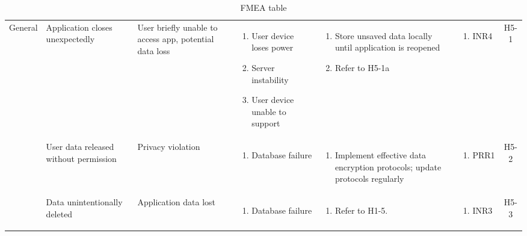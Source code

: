 \documentclass{article}
\begin{document}
\begin{longtable}{|p{1.7cm}|p{1.7cm} p{2.4cm} p{2.4cm} p{3.5cm} p{1.6cm} c|}
        General & Application closes unexpectedly & User briefly unable to access app, potential data loss & \vspace*{-\baselineskip}\begin{enumerate}[label=\alph*., left=0pt, nosep]\item User device loses power \item Server instability \item User device unable to support \end{enumerate} & \vspace*{-\baselineskip}\begin{enumerate}[label=\alph*., left=0pt, nosep] \item Store unsaved data locally until application is reopened \item Refer to H5-1a \end{enumerate} & \vspace*{-\baselineskip}\begin{enumerate}[label=\alph*., left=0pt, nosep] \item INR4 \end{enumerate} & H5-1\\
        \cline{2-7}
        & User data released without permission & Privacy violation & \vspace*{-\baselineskip}\begin{enumerate}[label=\alph*., left=0pt, nosep]\item Database failure \end{enumerate} & \vspace*{-\baselineskip}\begin{enumerate}[label=\alph*., left=0pt, nosep] \item Implement effective data encryption protocols; update protocols regularly \end{enumerate} & \vspace*{-\baselineskip}\begin{enumerate}[label=\alph*., left=0pt, nosep] \item PRR1 \end{enumerate} & H5-2\\
        \cline{2-7}
        & Data unintentionally deleted & Application data lost & \vspace*{-\baselineskip}\begin{enumerate}[label=\alph*., left=0pt, nosep]\item Database failure \end{enumerate} & \vspace*{-\baselineskip}\begin{enumerate}[label=\alph*., left=0pt, nosep] \item Refer to H1-5. \end{enumerate} & \vspace*{-\baselineskip}\begin{enumerate}[label=\alph*., left=0pt, nosep] \item INR3 \end{enumerate} & H5-3\\
        \hline
        \caption{FMEA table}
    \end{longtable}
\end{document}
